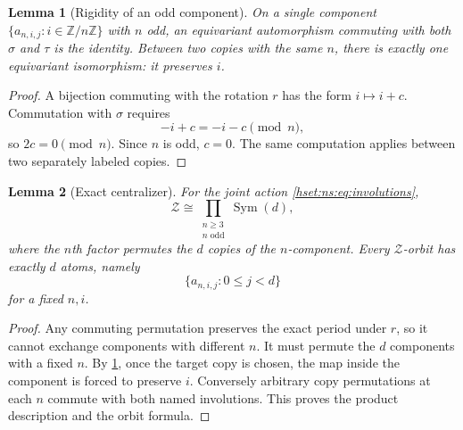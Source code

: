 \documentclass[11pt,letterpaper]{article}
\newtheorem{lemma}[lemma]{Lemma}\aliascntresetthe{lemma}
\theoremstyle{definition}
\theoremstyle{remark}
\newcommand{\Sym}{\operatorname{Sym}}
\begin{document}
\begin{lemma}[Rigidity of an odd component]\label{hset:ns:lem:odd}
On a single component $\{a_{n,i,j}:i\in\mathbb Z/n\mathbb Z\}$ with $n$ odd, an equivariant automorphism commuting with both $\sigma$ and $\tau$ is the identity. Between two copies with the same $n$, there is exactly one equivariant isomorphism: it preserves $i$.
\end{lemma}
\begin{proof}
A bijection commuting with the rotation $r$ has the form $i\mapsto i+c$. Commutation with $\sigma$ requires
\[
 -i+c=-i-c\pmod n,
\]
so $2c=0\pmod n$. Since $n$ is odd, $c=0$. The same computation applies between two separately labeled copies.
\end{proof}

\begin{lemma}[Exact centralizer]\label{hset:ns:lem:strictcentralizer}
For the joint action \eqref{hset:ns:eq:involutions},
\[
 \mathcal Z\cong\prod_{\substack{n\ge3\\ n\text{ odd}}}\Sym(d),
\]
where the $n$th factor permutes the $d$ copies of the $n$-component. Every $\mathcal Z$-orbit has exactly $d$ atoms, namely
\[
 \{a_{n,i,j}:0\le j<d\}
\]
for a fixed $n,i$.
\end{lemma}
\begin{proof}
Any commuting permutation preserves the exact period under $r$, so it cannot exchange components with different $n$. It must permute the $d$ components with a fixed $n$. By \cref{hset:ns:lem:odd}, once the target copy is chosen, the map inside the component is forced to preserve $i$. Conversely arbitrary copy permutations at each $n$ commute with both named involutions. This proves the product description and the orbit formula.
\end{proof}
\end{document}
